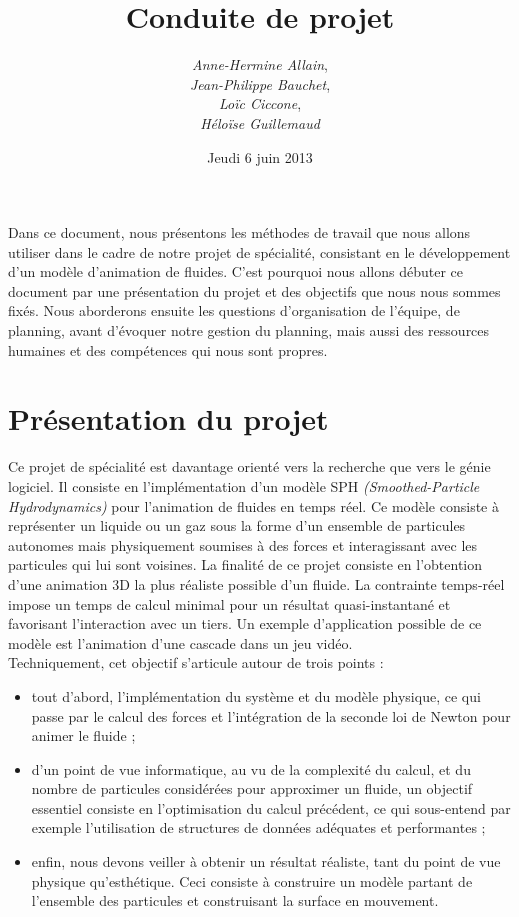 \documentclass[a4paper,10pt]{article}
\title{Conduite de projet}
\author{{\em Anne-Hermine Allain}, \\ 
{\em Jean-Philippe Bauchet}, \\ 
{\em Loïc Ciccone}, \\ 
{\em Héloïse Guillemaud}}
\date{Jeudi 6 juin 2013}
\begin{document}
\maketitle

Dans ce document, nous présentons les méthodes de travail que nous allons utiliser dans le cadre de notre projet de spécialité, consistant en le développement d'un modèle d'animation de fluides. C'est pourquoi nous allons débuter ce document par une présentation du projet et des objectifs que nous nous sommes fixés. Nous aborderons ensuite les questions d'organisation de l'équipe, de planning, avant d'évoquer notre gestion du planning, mais aussi des ressources humaines et des compétences qui nous sont propres.

\section{Présentation du projet}

Ce projet de spécialité est davantage orienté vers la recherche que vers le génie logiciel. Il consiste en l'implémentation d'un modèle SPH {\em (Smoothed-Particle Hydrodynamics)} pour l'animation de fluides en temps réel. Ce modèle consiste à représenter un liquide ou un gaz sous la forme d'un ensemble de particules autonomes mais physiquement soumises à des forces et interagissant avec les particules qui lui sont voisines. La finalité de ce projet consiste en l'obtention d'une animation 3D la plus réaliste possible d'un fluide. La contrainte temps-réel impose un temps de calcul minimal pour un résultat quasi-instantané et favorisant l'interaction avec un tiers. Un exemple d'application possible de ce modèle est l'animation d'une cascade dans un jeu vidéo. \\

Techniquement, cet objectif s'articule autour de trois points : \\

\begin{itemize}
\item tout d'abord, l'implémentation du système et du modèle physique, ce qui passe par le calcul des forces et l'intégration de la seconde loi de Newton pour animer le fluide ;
\item d'un point de vue informatique, au vu de la complexité du calcul, et du nombre de particules considérées pour approximer un fluide, un objectif essentiel consiste en l'optimisation du calcul précédent, ce qui sous-entend par exemple l'utilisation de structures de données adéquates et performantes ;
\item enfin, nous devons veiller à obtenir un résultat réaliste, tant du point de vue physique qu'esthétique. Ceci consiste à construire un modèle partant de l'ensemble des particules et construisant la surface en mouvement. \\
\end{itemize}
\end{document}
